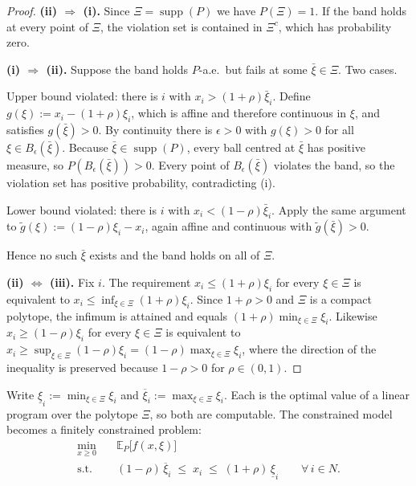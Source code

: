 \documentclass[11pt]{article}
\DeclareMathOperator*{\minimize}{min}
\DeclareMathOperator{\supp}{supp}
\theoremstyle{definition}
\begin{document}
\begin{proof}
\textbf{(ii) $\Rightarrow$ (i).} Since $\Xi = \supp(P)$ we have
$P(\Xi) = 1$. If the band holds at every point of $\Xi$, the violation set
is contained in $\Xi^{c}$, which has probability zero.

\textbf{(i) $\Rightarrow$ (ii).} Suppose the band holds $P$-a.e.\ but
fails at some $\bar\xi \in \Xi$. Two cases.

Upper bound violated: there is $i$ with $x_i > (1+\rho)\bar\xi_i$. Define
$g(\xi) := x_i - (1+\rho)\xi_i$, which is affine and therefore continuous
in $\xi$, and satisfies $g(\bar\xi) > 0$. By continuity there is
$\epsilon > 0$ with $g(\xi) > 0$ for all $\xi \in B_\epsilon(\bar\xi)$.
Because $\bar\xi \in \supp(P)$, every ball centred at $\bar\xi$ has
positive measure, so $P(B_\epsilon(\bar\xi)) > 0$. Every point of
$B_\epsilon(\bar\xi)$ violates the band, so the violation set has positive
probability, contradicting (i).

Lower bound violated: there is $i$ with $x_i < (1-\rho)\bar\xi_i$. Apply
the same argument to $\tilde g(\xi) := (1-\rho)\xi_i - x_i$, again affine
and continuous with $\tilde g(\bar\xi) > 0$.

Hence no such $\bar\xi$ exists and the band holds on all of $\Xi$.

\textbf{(ii) $\Leftrightarrow$ (iii).} Fix $i$. The requirement
$x_i \le (1+\rho)\xi_i$ for every $\xi \in \Xi$ is equivalent to
$x_i \le \inf_{\xi \in \Xi} (1+\rho)\xi_i$. Since $1+\rho > 0$ and $\Xi$
is a compact polytope, the infimum is attained and equals
$(1+\rho)\min_{\xi\in\Xi}\xi_i$. Likewise $x_i \ge (1-\rho)\xi_i$ for
every $\xi \in \Xi$ is equivalent to
$x_i \ge \sup_{\xi\in\Xi}(1-\rho)\xi_i = (1-\rho)\max_{\xi\in\Xi}\xi_i$,
where the direction of the inequality is preserved because
$1-\rho > 0$ for $\rho \in (0,1)$.
\end{proof}

Write $\underline{\xi}_i := \min_{\xi \in \Xi}\xi_i$ and
$\overline{\xi}_i := \max_{\xi \in \Xi}\xi_i$. Each is the optimal value of
a linear program over the polytope $\Xi$, so both are computable. The
constrained model becomes a finitely constrained problem:
\begin{align}
  \minimize_{x \ge 0} \quad & \mathbb{E}_{P}\big[ f(x,\xi) \big] \\
  \text{s.t.}\quad
    & (1-\rho)\,\overline{\xi}_i \;\le\; x_i \;\le\;
      (1+\rho)\,\underline{\xi}_i \qquad \forall\, i \in N .
  \label{eq:bandfinite}
\end{align}
\end{document}
